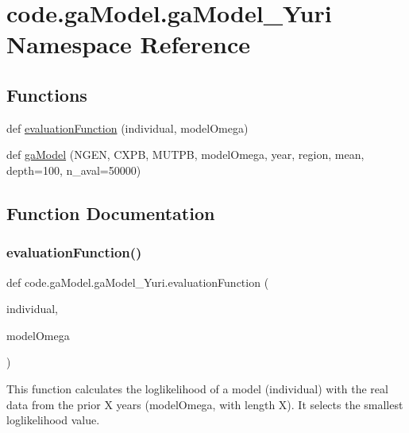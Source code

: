 \hypertarget{namespacecode_1_1ga_model_1_1ga_model___yuri}{}\section{code.\+ga\+Model.\+ga\+Model\+\_\+\+Yuri Namespace Reference}
\label{namespacecode_1_1ga_model_1_1ga_model___yuri}
\subsection*{Functions}
\begin{DoxyCompactItemize}
\item 
def \hyperlink{namespacecode_1_1ga_model_1_1ga_model___yuri_ac3d4d6d1e77c40f783c7ca57c88a3731}{evaluation\+Function} (individual, model\+Omega)
\item 
def \hyperlink{namespacecode_1_1ga_model_1_1ga_model___yuri_a358c4a2cdf3f30fc75df90095a4b8355}{ga\+Model} (N\+G\+EN, C\+X\+PB, M\+U\+T\+PB, model\+Omega, year, region, mean, depth=100, n\+\_\+aval=50000)
\end{DoxyCompactItemize}


\subsection{Function Documentation}
\mbox{\label{namespacecode_1_1ga_model_1_1ga_model___yuri_ac3d4d6d1e77c40f783c7ca57c88a3731}} 
\subsubsection{\texorpdfstring{evaluation\+Function()}{evaluationFunction()}}
{\footnotesize\ttfamily def code.\+ga\+Model.\+ga\+Model\+\_\+\+Yuri.\+evaluation\+Function (\begin{DoxyParamCaption}\item[{}]{individual,  }\item[{}]{model\+Omega }\end{DoxyParamCaption})}

\begin{DoxyVerb}This function calculates the loglikelihood of a model (individual) with 
the real data from the prior X years (modelOmega, with length X).
It selects the smallest loglikelihood value.
\end{DoxyVerb}
 

